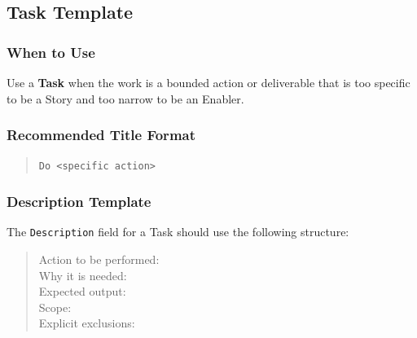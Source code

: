 \documentclass[11pt,a4paper]{article}
\begin{document}
\subsection{Task Template}

\subsubsection*{When to Use}
Use a \textbf{Task} when the work is a bounded action or deliverable that is too specific to be a Story and too narrow to be an Enabler.

\subsubsection*{Recommended Title Format}
\begin{quote}
\texttt{Do <specific action>}
\end{quote}

\subsubsection*{Description Template}
The \texttt{Description} field for a Task should use the following structure:
\begin{quote}
Action to be performed: \\
Why it is needed: \\
Expected output: \\
Scope: \\
Explicit exclusions:
\end{quote}
\end{document}

